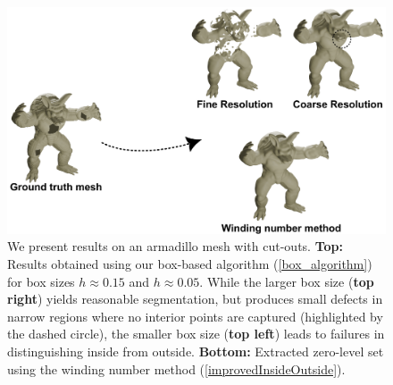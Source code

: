 \documentclass[12pt,openany]{book}
\theoremstyle{plainnormal}
\theoremstyle{remark}
\begin{document}
\begin{figure}[!t]
    \centering
    \includegraphics[width=\linewidth]{Figures/WindingNumberFig.pdf}
    \caption{We present results on an armadillo mesh with cut-outs. \textbf{Top:} Results obtained using our box-based algorithm (\cref{box_algorithm}) for box sizes $h \approx 0.15$ and $h \approx 0.05$. While the larger box size (\textbf{top right}) yields reasonable segmentation, but produces small defects in narrow regions where no interior points are captured (highlighted by the dashed circle), the smaller box size (\textbf{top left}) leads to failures in distinguishing inside from outside. \textbf{Bottom:} Extracted zero-level set using the winding number method (\cref{improvedInsideOutside}).
}
    \label{Winding_fig}
\end{figure}
\end{document}
